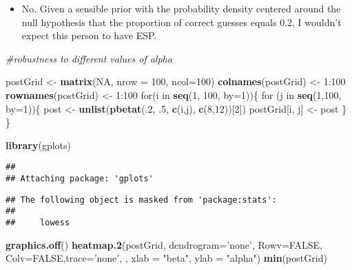 \documentclass[]{tufte-handout}
\newenvironment{Shaded}{}{}
\newcommand{\KeywordTok}[1]{\textcolor[rgb]{0.00,0.44,0.13}{\textbf{{#1}}}}
\newcommand{\DataTypeTok}[1]{\textcolor[rgb]{0.56,0.13,0.00}{{#1}}}
\newcommand{\DecValTok}[1]{\textcolor[rgb]{0.25,0.63,0.44}{{#1}}}
\newcommand{\StringTok}[1]{\textcolor[rgb]{0.25,0.44,0.63}{{#1}}}
\newcommand{\CommentTok}[1]{\textcolor[rgb]{0.38,0.63,0.69}{\textit{{#1}}}}
\newcommand{\OtherTok}[1]{\textcolor[rgb]{0.00,0.44,0.13}{{#1}}}
\newcommand{\NormalTok}[1]{{#1}}
\begin{document}
\begin{itemize}
\itemsep1pt\parskip0pt
\item
  No. Given a sensible prior with the probability density centered
  around the null hypothesis that the proportion of correct guesses
  equals 0.2, I wouldn't expect this person to have ESP.
\end{itemize}

\begin{Shaded}
\begin{Highlighting}[]
\CommentTok{#robustness to different values of alpha}

\NormalTok{postGrid <-}\StringTok{ }\KeywordTok{matrix}\NormalTok{(}\OtherTok{NA}\NormalTok{, }\DataTypeTok{nrow =} \DecValTok{100}\NormalTok{, }\DataTypeTok{ncol=}\DecValTok{100}\NormalTok{)}
\KeywordTok{colnames}\NormalTok{(postGrid) <-}\StringTok{ }\DecValTok{1}\NormalTok{:}\DecValTok{100}
\KeywordTok{rownames}\NormalTok{(postGrid) <-}\StringTok{ }\DecValTok{1}\NormalTok{:}\DecValTok{100}
\NormalTok{for(i in }\KeywordTok{seq}\NormalTok{(}\DecValTok{1}\NormalTok{, }\DecValTok{100}\NormalTok{, }\DataTypeTok{by=}\DecValTok{1}\NormalTok{))\{}
  \NormalTok{for (j in }\KeywordTok{seq}\NormalTok{(}\DecValTok{1}\NormalTok{,}\DecValTok{100}\NormalTok{, }\DataTypeTok{by=}\DecValTok{1}\NormalTok{))\{}
    \NormalTok{post <-}\StringTok{ }\KeywordTok{unlist}\NormalTok{(}\KeywordTok{pbetat}\NormalTok{(.}\DecValTok{2}\NormalTok{, .}\DecValTok{5}\NormalTok{, }\KeywordTok{c}\NormalTok{(i,j), }\KeywordTok{c}\NormalTok{(}\DecValTok{8}\NormalTok{,}\DecValTok{12}\NormalTok{))[}\DecValTok{2}\NormalTok{])}
    \NormalTok{postGrid[i, j] <-}\StringTok{ }\NormalTok{post}
  \NormalTok{\}}
\NormalTok{\}}



\KeywordTok{library}\NormalTok{(gplots)}
\end{Highlighting}
\end{Shaded}

\begin{verbatim}
## 
## Attaching package: 'gplots'
\end{verbatim}

\begin{verbatim}
## The following object is masked from 'package:stats':
## 
##     lowess
\end{verbatim}

\begin{Shaded}
\begin{Highlighting}[]
\KeywordTok{graphics.off}\NormalTok{()}
\KeywordTok{heatmap.2}\NormalTok{(postGrid, }\DataTypeTok{dendrogram=}\StringTok{'none'}\NormalTok{, }\DataTypeTok{Rowv=}\OtherTok{FALSE}\NormalTok{, }\DataTypeTok{Colv=}\OtherTok{FALSE}\NormalTok{,}\DataTypeTok{trace=}\StringTok{'none'}\NormalTok{, , }\DataTypeTok{xlab =} \StringTok{"beta"}\NormalTok{, }\DataTypeTok{ylab =} \StringTok{"alpha"}\NormalTok{)}
\KeywordTok{min}\NormalTok{(postGrid)}
\end{Highlighting}
\end{Shaded}
\end{document}
